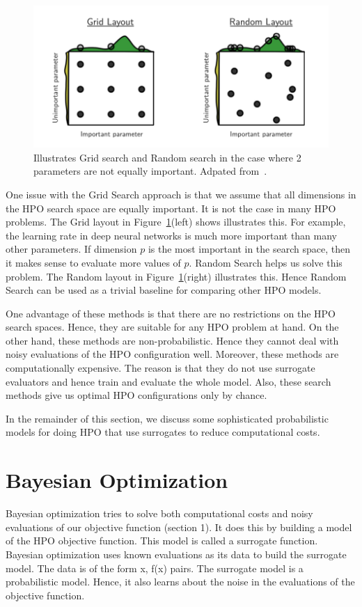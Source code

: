 \documentclass[11pt]{report}
\begin{document}
\begin{figure}[htb]
  \centering
    \includegraphics[scale=0.8]{images/rsgsexample}
    \caption{Illustrates Grid search and Random search in the case where 2 parameters are not equally important.  Adpated from~\cite{rshpoarticle}.}
    \label{fig:rshpofig}
\end{figure}

One issue with the Grid Search approach is that we assume that all dimensions in the HPO search space are equally important. It is not the case in many HPO problems.  The Grid layout in Figure~\ref{fig:rshpofig}(left) shows illustrates this.  For example, the learning rate in deep neural networks is much more important than many other parameters. If dimension $p$ is the most important in the search space, then it makes sense to evaluate more values of $p$. Random Search helps us solve this problem. 
The Random layout in Figure~\ref{fig:rshpofig}(right) illustrates this. 
Hence Random Search can be used as a trivial baseline for comparing other HPO models.

One advantage of these methods is that there are no restrictions on the HPO search spaces. Hence, they are suitable for any HPO problem at hand.
On the other hand, these methods are non-probabilistic.
Hence they cannot deal with noisy evaluations of the HPO configuration well.
Moreover, these methods are computationally expensive. The reason is that they do not use surrogate evaluators and hence train and evaluate the whole model.
Also, these search methods give us optimal HPO configurations only by chance.

In the remainder of this section, we discuss some sophisticated probabilistic models for doing HPO that use surrogates to reduce computational costs.

\section{Bayesian Optimization}
Bayesian optimization tries to solve both computational costs and noisy evaluations of our objective function (section 1).
It does this by building a model of the HPO objective function. This model is called a surrogate function.
Bayesian optimization uses known evaluations as its data to build the surrogate model. The data is of the form {x, f(x)} pairs.
The surrogate model is a probabilistic model. Hence, it also learns about the noise in the evaluations of the objective function.
\end{document}
